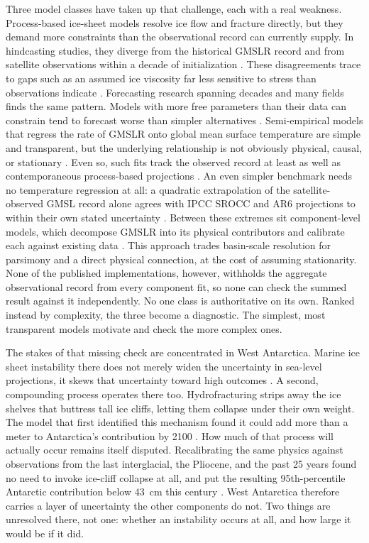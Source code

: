 \documentclass[12pt]{article}
\begin{document}
Three model classes have taken up that challenge, each with a real
weakness. Process-based ice-sheet models resolve ice flow and fracture
directly, but they demand more constraints than the observational
record can currently supply. In hindcasting studies, they diverge from
the historical GMSLR record \citep{Aschwanden2021} and from satellite
observations within a decade of initialization \citep{Fricker2025}.
These disagreements trace to gaps such as an assumed ice viscosity far
less sensitive to stress than observations indicate
\citep{Millstein2022,GetraerMorlighem2025}. Forecasting research
spanning decades and many fields finds the same pattern. Models with
more free parameters than their data can constrain tend to forecast
worse than simpler alternatives \citep{Green2015,Makridakis2020}.
Semi-empirical models that regress the rate of GMSLR onto global mean
surface temperature are simple and transparent, but the underlying
relationship is not obviously physical, causal, or stationary
\citep{Rahmstorf2007,Vermeer2009,Church2013}. Even so, such fits track
the observed record at least as well as contemporaneous process-based
projections \citep{Rahmstorf2012}. An even simpler benchmark needs no
temperature regression at all: a quadratic extrapolation of the
satellite-observed GMSL record alone agrees with IPCC SROCC and AR6
projections to within their own stated uncertainty \citep{Nerem2022}.
Between these extremes sit
component-level models, which decompose GMSLR into its physical
contributors and calibrate each against existing data
\citep{Kopp2014,Mengel2016,Wong2017}. This approach trades basin-scale
resolution for parsimony and a direct physical connection, at the cost
of assuming stationarity. None of the published implementations,
however, withholds the aggregate observational record from every
component fit, so none can check the summed result against it
independently. No one class is authoritative on its own. Ranked instead
by complexity, the three become a diagnostic. The simplest, most
transparent models motivate and check the more complex ones.

The stakes of that missing check are concentrated in West Antarctica.
Marine ice sheet instability there does not merely widen the
uncertainty in sea-level projections, it skews that uncertainty toward
high outcomes \citep{Robel2019}. A second, compounding process operates
there too. Hydrofracturing strips away the ice shelves that buttress
tall ice cliffs, letting them collapse under their own weight. The
model that first identified this mechanism found it could add more
than a meter to Antarctica's contribution by 2100 \citep{DeContoP2016}.
How much of that process will actually occur remains itself disputed.
Recalibrating the same physics against observations from the last
interglacial, the Pliocene, and the past 25 years found no need to
invoke ice-cliff collapse at all, and put the resulting 95th-percentile
Antarctic contribution below 43~cm this century \citep{Edwards2019}.
West Antarctica therefore carries a layer of uncertainty the other
components do not. Two things are unresolved there, not one: whether an
instability occurs at all, and how large it would be if it did.
\end{document}
